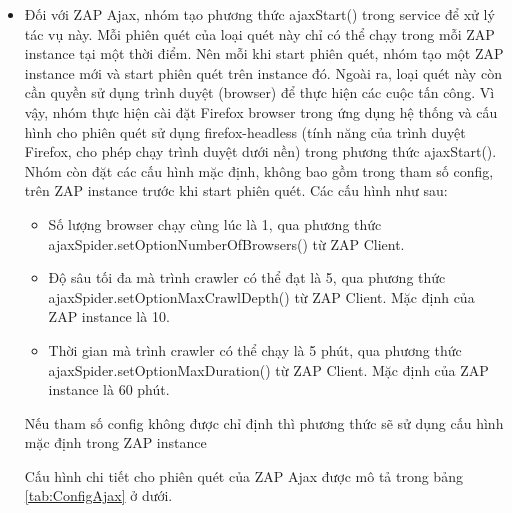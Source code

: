\begin{itemize}
  \item Đối với ZAP Ajax, nhóm tạo phương thức ajaxStart() trong service để xử lý tác vụ này. Mỗi phiên quét của loại quét này chỉ có thể chạy trong mỗi ZAP instance tại một thời điểm. Nên mỗi khi start phiên quét, nhóm tạo một ZAP instance mới và start phiên quét trên instance đó. Ngoài ra, loại quét này còn cần quyền sử dụng trình duyệt (browser) để thực hiện các cuộc tấn công. Vì vậy, nhóm thực hiện cài đặt Firefox browser trong ứng dụng hệ thống và cấu hình cho phiên quét sử dụng firefox-headless (tính năng của trình duyệt Firefox, cho phép chạy trình duyệt dưới nền) trong phương thức ajaxStart(). Nhóm còn đặt các cấu hình mặc định, không bao gồm trong tham số config, trên ZAP instance trước khi start phiên quét. Các cấu hình như sau:
        \begin{itemize}
          \item Số lượng browser chạy cùng lúc là 1, qua phương thức \\
                ajaxSpider.setOptionNumberOfBrowsers() từ ZAP Client.
          \item Độ sâu tối đa mà trình crawler có thể đạt là 5, qua phương thức \\
                ajaxSpider.setOptionMaxCrawlDepth() từ ZAP Client. Mặc định của ZAP instance là 10.
          \item Thời gian mà trình crawler có thể chạy là 5 phút, qua phương thức \\
                ajaxSpider.setOptionMaxDuration() từ ZAP Client. Mặc định của ZAP instance là 60 phút.
        \end{itemize}
        Nếu tham số config không được chỉ định thì phương thức sẽ sử dụng cấu hình mặc định trong ZAP instance

        Cấu hình chi tiết cho phiên quét của ZAP Ajax được mô tả trong bảng \ref{tab:ConfigAjax} ở dưới.


\end{itemize}
